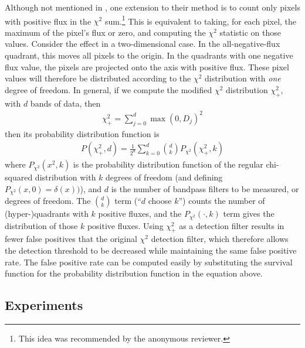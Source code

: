 \documentclass[11pt,letterpaper,linenumbers]{aastex63}
\newcommand{\chipos}{\chi_+}
\begin{document}
Although not mentioned in \cite{szalay1999}, one extension to their
method is to count only pixels with positive flux in the $\chi^2$
sum.\footnote{This idea was recommended by the anonymous reviewer.}
This is equivalent to taking, for each pixel, the maximum of the
pixel's flux or zero, and computing the $\chi^2$ statistic on those
values.  Consider the effect in a two-dimensional case.  In the
all-negative-flux quadrant, this moves all pixels to the origin.  In
the quadrants with one negative flux value, the pixels are projected
onto the axis with positive flux.  These pixel values will therefore
be distributed according to the $\chi^2$ distribution with \emph{one}
degree of freedom.  In general, if we compute the modified $\chi^2$
distribution $\chipos^2$, with $d$ bands of data, then
\begin{eqnarray}
  \chipos^2 = \sum_{j=0}^d \max(0, D_j)^2
  \label{eqn:chipos}
\end{eqnarray}
then its probability distribution function is
\begin{eqnarray}
P(\chipos^2, d) = \frac{1}{2^d} \sum_{k=0}^d \binom{d}{k} P_{\chi^2}(\chipos^2, k)
\end{eqnarray}
where $P_{\chi^2}(x^2, k)$ is the probability distribution function of
the regular chi-squared distribution with $k$ degrees of freedom (and
defining $P_{\chi^2}(x, 0) = \delta(x))$), and $d$ is the number of
bandpass filters to be measured, or degrees of freedom.  The
$\binom{d}{k}$ term (``$d$ choose $k$'') counts the number of (hyper-)quadrants with $k$
positive fluxes, and the $P_{\chi^2}(\cdot, k)$ term gives the distribution of those $k$ positive fluxes.  Using
$\chipos^2$ as a detection filter results in fewer false positives
that the original $\chi^2$ detection filter, which therefore allows
the detection threshold to be decreased while maintaining the same
false positive rate.  The false positive rate can be computed easily
by substituting the survival function for the probability distribution
function in the equation above.

\subsection{Experiments}
\label{sec:chisq_expt}
\end{document}
